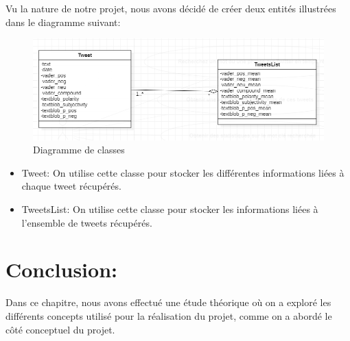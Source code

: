 Vu la nature de notre projet, nous avons décidé de créer deux entités illustrées dans le diagramme suivant:
\begin{figure}[H]
    \centering
    \includegraphics[width=\textwidth]{chapitre2/assets/classDiagram.png}
    \caption{Diagramme de classes}
    \label{fig:my_label}
\end{figure}
\begin{itemize}
    \item \textcolor{DispositionColor}{Tweet:} On utilise cette classe pour stocker les différentes informations liées à chaque tweet récupérés.
    \item \textcolor{DispositionColor}{TweetsList:} On utilise cette classe pour stocker les informations liées à l'ensemble de tweets récupérés.
\end{itemize}
\section{Conclusion:}
Dans ce chapitre, nous avons effectué une étude théorique où on a exploré les différents concepts utilisé pour la réalisation du projet, comme on a abordé le côté conceptuel du projet. 




